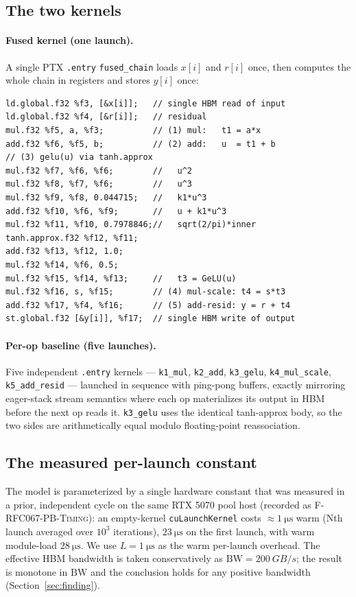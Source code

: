 \documentclass[11pt,a4paper]{article}
\begin{document}
\subsection{The two kernels}

\paragraph{Fused kernel (one launch).} A single PTX \texttt{.entry}
\texttt{fused\_chain} loads $x[i]$ and $r[i]$ once, then computes the whole
chain in registers and stores $y[i]$ once:
\begin{lstlisting}
ld.global.f32 %f3, [&x[i]];   // single HBM read of input
ld.global.f32 %f4, [&r[i]];   // residual
mul.f32 %f5, a, %f3;          // (1) mul:   t1 = a*x
add.f32 %f6, %f5, b;          // (2) add:   u  = t1 + b
// (3) gelu(u) via tanh.approx
mul.f32 %f7, %f6, %f6;        //   u^2
mul.f32 %f8, %f7, %f6;        //   u^3
mul.f32 %f9, %f8, 0.044715;   //   k1*u^3
add.f32 %f10, %f6, %f9;       //   u + k1*u^3
mul.f32 %f11, %f10, 0.7978846;//   sqrt(2/pi)*inner
tanh.approx.f32 %f12, %f11;
add.f32 %f13, %f12, 1.0;
mul.f32 %f14, %f6, 0.5;
mul.f32 %f15, %f14, %f13;     //   t3 = GeLU(u)
mul.f32 %f16, s, %f15;        // (4) mul-scale: t4 = s*t3
add.f32 %f17, %f4, %f16;      // (5) add-resid: y = r + t4
st.global.f32 [&y[i]], %f17;  // single HBM write of output
\end{lstlisting}

\paragraph{Per-op baseline (five launches).} Five independent
\texttt{.entry} kernels --- \texttt{k1\_mul}, \texttt{k2\_add},
\texttt{k3\_gelu}, \texttt{k4\_mul\_scale}, \texttt{k5\_add\_resid} --- launched
in sequence with ping-pong buffers, exactly mirroring eager-stack stream
semantics where each op materializes its output in HBM before the next op reads
it. \texttt{k3\_gelu} uses the identical tanh-approx body, so the two sides are
arithmetically equal modulo floating-point reassociation.

\subsection{The measured per-launch constant}

The model is parameterized by a single hardware constant that was measured in a
prior, independent cycle on the same RTX 5070 pool host (recorded as
\textsc{F-RFC067-PB-Timing}): an empty-kernel \texttt{cuLaunchKernel} costs
$\approx \SI{1}{\micro\second}$ warm (Nth launch averaged over $10^3$
iterations), $\SI{23}{\micro\second}$ on the first launch, with warm
module-load $\SI{28}{\micro\second}$. We use $L = \SI{1}{\micro\second}$ as the
warm per-launch overhead. The effective HBM bandwidth is taken conservatively
as $\mathrm{BW} = \SI{200}{GB/s}$; the result is monotone in $\mathrm{BW}$ and
the conclusion holds for any positive bandwidth (Section~\ref{sec:finding}).
\end{document}
